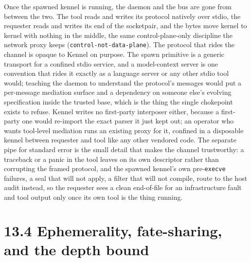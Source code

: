 Once the spawned kennel is running, the daemon and the bus are gone from
between the two. The tool reads and writes its protocol natively over
stdio, the requester reads and writes its end of the socketpair, and the
bytes move kernel to kernel with nothing in the middle, the same
control-plane-only discipline the network proxy keeps
(\texttt{control-not-data-plane}). The protocol that rides the channel
is opaque to Kennel on purpose. The spawn primitive is a generic
transport for a confined stdio service, and a model-context server is
one convention that rides it exactly as a language server or any other
stdio tool would; teaching the daemon to understand the protocol's
messages would put a per-message mediation surface and a dependency on
someone else's evolving specification inside the trusted base, which is
the thing the single chokepoint exists to refuse. Kennel writes no
first-party interposer either, because a first-party one would re-import
the exact parser it just kept out; an operator who wants tool-level
mediation runs an existing proxy for it, confined in a disposable kennel
between requester and tool like any other vendored code. The separate
pipe for standard error is the small detail that makes the channel
trustworthy: a traceback or a panic in the tool leaves on its own
descriptor rather than corrupting the framed protocol, and the spawned
kennel's own pre-\texttt{execve} failures, a seal that will not apply, a
filter that will not compile, route to the host audit instead, so the
requester sees a clean end-of-file for an infrastructure fault and tool
output only once its own tool is the thing running.

\hypertarget{ephemerality-fate-sharing-and-the-depth-bound}{%
\section{13.4 Ephemerality, fate-sharing, and the depth
bound}\label{ephemerality-fate-sharing-and-the-depth-bound}}


